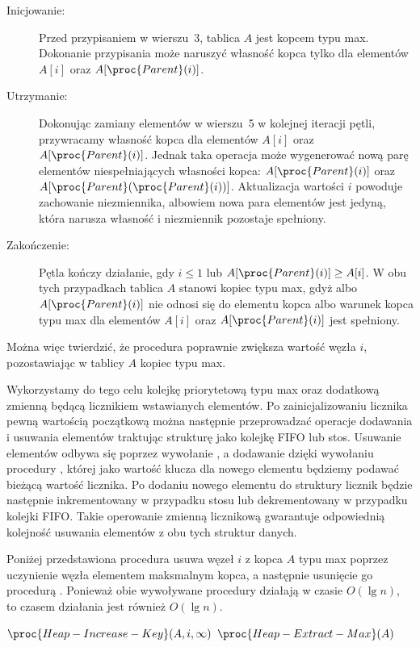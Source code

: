 \exercise %
\begin{description}
	\item[Inicjowanie:] Przed przypisaniem w wierszu~3, tablica $A$ jest kopcem typu max. Dokonanie przypisania może naruszyć własność kopca tylko dla elementów $A[i]$ oraz $A[\proc{Parent}(i)]$.
	\item[Utrzymanie:] Dokonując zamiany elementów w wierszu~5 w kolejnej iteracji pętli, przywracamy własność kopca dla elementów $A[i]$ oraz $A[\proc{Parent}(i)]$. Jednak taka operacja może wygenerować nową parę elementów niespełniających własności kopca: $A[\proc{Parent}(i)]$ oraz $A[\proc{Parent}(\proc{Parent}(i))]$. Aktualizacja wartości $i$ powoduje zachowanie niezmiennika, albowiem nowa para elementów jest jedyną, która narusza własność i niezmiennik pozostaje spełniony.
	\item[Zakończenie:] Pętla kończy działanie, gdy $i\le1$ lub $A[\proc{Parent}(i)]\ge A[i]$. W obu tych przypadkach tablica $A$ stanowi kopiec typu max, gdyż albo $A[\proc{Parent}(i)]$ nie odnosi się do elementu kopca albo warunek kopca typu max dla elementów $A[i]$ oraz $A[\proc{Parent}(i)]$ jest spełniony.
\end{description}
Można więc twierdzić, że procedura  poprawnie zwiększa wartość węzła $i$, pozostawiając w tablicy $A$ kopiec typu max.

\exercise %
Wykorzystamy do tego celu kolejkę priorytetową typu max oraz dodatkową zmienną będącą licznikiem wstawianych elementów. Po zainicjalizowaniu licznika pewną wartością początkową można następnie przeprowadzać operacje dodawania i usuwania elementów traktując strukturę jako kolejkę FIFO lub stos. Usuwanie elementów odbywa się poprzez wywołanie , a dodawanie dzięki wywołaniu procedury , której jako wartość klucza dla nowego elementu będziemy podawać bieżącą wartość licznika. Po dodaniu nowego elementu do struktury licznik będzie następnie inkrementowany w przypadku stosu lub dekrementowany w przypadku kolejki FIFO. Takie operowanie zmienną licznikową gwarantuje odpowiednią kolejność usuwania elementów z obu tych struktur danych.

\exercise %
Poniżej przedstawiona procedura  usuwa węzeł $i$ z  kopca $A$ typu max poprzez uczynienie węzła elementem maksmalnym kopca, a następnie usunięcie go procedurą . Ponieważ obie wywoływane procedury działają w czasie $O(\lg n)$, to czasem działania  jest również $O(\lg n)$.
\begin{codebox}
\li	$\proc{Heap-Increase-Key}(A,i,\infty)$
\li	$\proc{Heap-Extract-Max}(A)$
\end{codebox}

